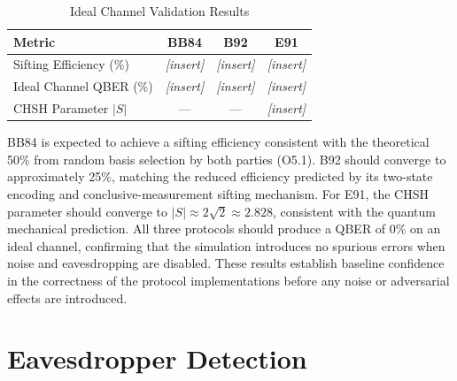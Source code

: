 \documentclass[10pt, a4paper]{report}
\begin{document}
\begin{table}[ht]
    \centering
    \caption{Ideal Channel Validation Results}
    \label{tab:validation}
    \begin{tabular}{l c c c}
        \toprule
        \textbf{Metric} & \textbf{BB84} & \textbf{B92} & \textbf{E91} \\
        \midrule
        Sifting Efficiency (\%) & \textit{[insert]} & \textit{[insert]} & \textit{[insert]} \\
        Ideal Channel QBER (\%) & \textit{[insert]} & \textit{[insert]} & \textit{[insert]} \\
        CHSH Parameter $|S|$ & --- & --- & \textit{[insert]} \\
        \bottomrule
    \end{tabular}
\end{table}

BB84 is expected to achieve a sifting efficiency consistent with the theoretical 50\% from random basis selection by both parties (O5.1). B92 should converge to approximately 25\%, matching the reduced efficiency predicted by its two-state encoding and conclusive-measurement sifting mechanism. For E91, the CHSH parameter should converge to $|S| \approx 2\sqrt{2} \approx 2.828$, consistent with the quantum mechanical prediction. All three protocols should produce a QBER of 0\% on an ideal channel, confirming that the simulation introduces no spurious errors when noise and eavesdropping are disabled. These results establish baseline confidence in the correctness of the protocol implementations before any noise or adversarial effects are introduced.




\section{Eavesdropper Detection}

\end{document}
